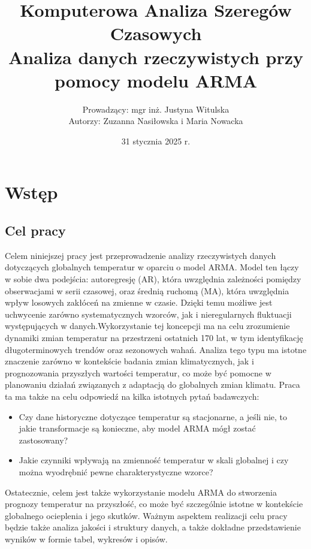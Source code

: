 \documentclass[12pt]{article}
\title{Komputerowa Analiza Szeregów Czasowych \\ 
\textbf{Analiza danych rzeczywistych przy pomocy modelu ARMA} }
\author{Prowadzący: mgr inż. Justyna Witulska \\  Autorzy: Zuzanna Nasiłowska i Maria Nowacka}
\date{31 stycznia 2025 r.}
\begin{document}
\maketitle

\section{Wstęp}
\subsection{Cel pracy}
Celem niniejszej pracy jest przeprowadzenie analizy rzeczywistych danych dotyczących globalnych temperatur w oparciu o model ARMA. Model ten łączy w sobie dwa podejścia: autoregresję (AR), która uwzględnia zależności pomiędzy obserwacjami w serii czasowej, oraz średnią ruchomą (MA), która uwzględnia wpływ losowych zakłóceń na zmienne w czasie. Dzięki temu możliwe jest uchwycenie zarówno systematycznych wzorców, jak i nieregularnych fluktuacji występujących w danych.Wykorzystanie tej koncepcji ma na celu zrozumienie dynamiki zmian temperatur na przestrzeni ostatnich 170 lat, w tym identyfikację długoterminowych trendów oraz sezonowych wahań. Analiza tego typu ma istotne znaczenie zarówno w kontekście badania zmian klimatycznych, jak i prognozowania przyszłych wartości temperatur, co może być pomocne w 
planowaniu działań związanych z adaptacją do globalnych zmian klimatu.
Praca ta ma także na celu odpowiedź na kilka istotnych pytań badawczych: 
\begin{itemize}
    \item Czy dane historyczne dotyczące temperatur są stacjonarne, a jeśli nie, to jakie transformacje są konieczne, aby model ARMA mógł zostać zastosowany? 
    \item  Jakie czynniki wpływają na zmienność temperatur w skali globalnej i czy można wyodrębnić pewne charakterystyczne wzorce?
\end{itemize}
Ostatecznie, celem jest także wykorzystanie modelu ARMA do stworzenia prognozy temperatur na przyszłość, co może być szczególnie istotne w kontekście globalnego ocieplenia i jego skutków. Ważnym aspektem realizacji celu pracy będzie także analiza jakości i struktury danych, a także dokładne przedstawienie wyników w formie tabel, wykresów i opisów.
\end{document}
